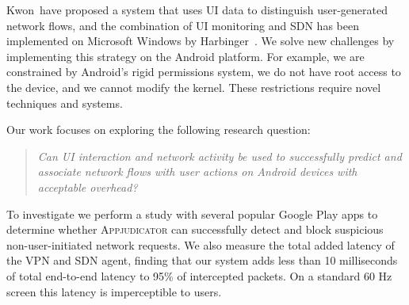 Kwon~\etal have proposed a system that uses UI data to distinguish
user-generated network flows, and the combination of UI monitoring and SDN has
been implemented on Microsoft Windows by Harbinger~\cite{chuluundorj2019}.  We
solve new challenges by implementing this strategy on the Android platform. For
example, we are constrained by Android's rigid permissions system, we do not
have root access to the device, and we cannot modify the kernel. These
restrictions require novel techniques and systems.

Our work focuses on exploring the following research question: 
\begin{quote}
	\textit{Can UI interaction and network activity be used to successfully
		predict and associate network flows with user actions on Android devices
		with acceptable overhead?}
\end{quote}

To investigate we perform a study with several popular Google Play apps to
determine whether \textsc{Appjudicator} can successfully detect and block
suspicious non-user-initiated network requests. %
We also measure the total added latency of the VPN and SDN agent, finding that
our system adds less than 10 milliseconds of total end-to-end latency to 95\% of
intercepted packets. On a standard 60 Hz screen this latency is imperceptible to
users.


\newpage
